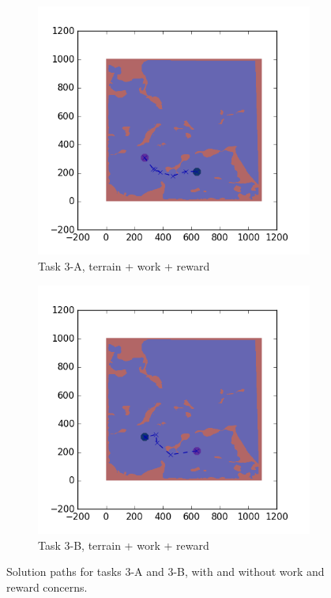 \documentclass{tamuccthesis}
\begin{document}
\begin{figure}
  \begin{subfigure}[b]{0.4\textwidth}
        \centering
        \includegraphics[width=\textwidth,trim={4cm 3cm 2cm 3cm},clip]{EXP3RG_PathCa_-1_-1_-1_-1.png}
        \caption[]{{\small Task 3-A, terrain + work + reward}}    
        \label{fig:Path_3-A_terrain_work_reward}
    \end{subfigure}
    \hfill
    \begin{subfigure}[b]{0.4\textwidth}  
        \centering 
        \includegraphics[width=\textwidth,trim={4cm 3cm 2cm 3cm},clip]{EXP3RG_PathCb_-1_-1_-1_-1.png}
        \caption[]{{\small Task 3-B, terrain + work + reward}}   
        \label{fig:Path_3-B_terrain_work_reward}
    \end{subfigure}

    \caption[]{\small Solution paths for tasks 3-A and 3-B, with and without work and reward concerns.} 
    \label{fig:Paths_3-A_3-B}
\end{figure}
\end{document}
